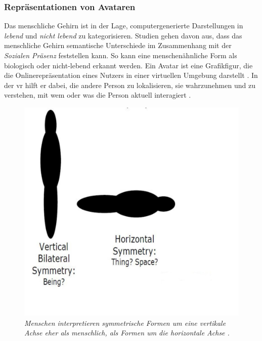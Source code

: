 \documentclass[a4paper,11pt]{article}%
\renewcommand{\\}{\vspace*{0.5\baselineskip} \newline}
\begin{document}
\subsubsection{Repräsentationen von Avataren}
Das menschliche Gehirn ist in der Lage, computergenerierte Darstellungen in \textit{lebend} und \textit{nicht lebend} zu kategorisieren. Studien gehen davon aus, dass das menschliche Gehirn semantische Unterschiede im Zusammenhang mit der \textit{Sozialen Präsenz} feststellen kann. So kann eine menschenähnliche Form als biologisch oder nicht-lebend erkannt werden. 
Ein Avatar ist eine Grafikfigur, die die Onlinerepräsentation eines Nutzers in einer virtuellen Umgebung darstellt \citep[S. 196]{neitzel2010bin}. In der \ac{vr} hilft er dabei, die andere Person zu lokalisieren, sie wahrzunehmen und zu verstehen, mit wem oder was die Person aktuell interagiert \citep{pan2017impact}.

	\begin{figure}[b!]
		\begin{footnotesize}
		\centering
			\includegraphics[scale= 0.3]{Abbildungen/Symmetry.JPG}
			\caption[Vertical and horizontal beeings]{\textit{Menschen interpretieren symmetrische Formen um eine vertikale Achse eher als menschlich, als Formen um die horizontale Achse \citep{biocca2002defining}.}}
			\label{vertical_horizontal}
		\end{footnotesize}
	\end{figure}
\end{document}
